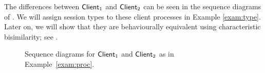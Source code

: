 \begin{example}
%
%
%

The differences between $\mathsf{Client}_1$ and $\mathsf{Client}_2$ can be  seen in the sequence diagrams of . 
We will assign session types to these client processes in Example \ref{exam:type}.
Later on, we will show that they are behaviourally equivalent using characteristic bisimilarity;
see .
\begin{figure}

\caption{Sequence diagrams for $\mathsf{Client}_1$ and $\mathsf{Client}_2$ as in Example~\ref{exam:proc}\label{fig:exam}.}
\vspace{-2mm}
\end{figure}
\end{example}
